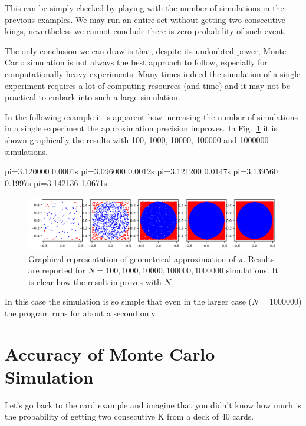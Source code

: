 This can be simply checked by playing with the number of simulations in the previous examples. We may run an entire set without getting two consecutive kings, nevertheless we cannot conclude there is zero probability of such event.

The only conclusion we can draw is that, despite its undoubted power, Monte Carlo simulation is not always the best approach to follow, especially for computationally heavy experiments. Many times indeed the simulation of a single experiment requires a lot of computing resources (and time) and it may not be practical to embark into such a large simulation.

In the following example it is apparent how increasing the number of simulations in a single experiment the approximation precision improves. In Fig.~\ref{fig:circle_approx} it is shown graphically the results with 100, 1000, 10000, 100000 and 1000000 simulations.

\begin{ioutput}
pi=3.120000 0.0001s
pi=3.096000 0.0012s
pi=3.121200 0.0147s
pi=3.139560 0.1997s
pi=3.142136 1.0671s
\end{ioutput}

\begin{figure}[htb]
\centering
\includegraphics[width=1\textwidth]{figures/mc_vs_n_experiments}
\caption{Graphical representation of geometrical approximation of $\pi$. Results are reported for $N = 100, 1000, 10000, 100000, 1000000$ simulations. It is clear how the result improves with $N$.}
\label{fig:circle_approx}
\end{figure}

In this case the simulation is so simple that even in the larger case ($N=1000000$) the program runs for about a second only.

\section{Accuracy of Monte Carlo Simulation}
\label{sec:confidence_interval}

Let's go back to the card example and imagine that you didn't know how much is the probability of getting two consecutive K from a deck of 40 cards. 

